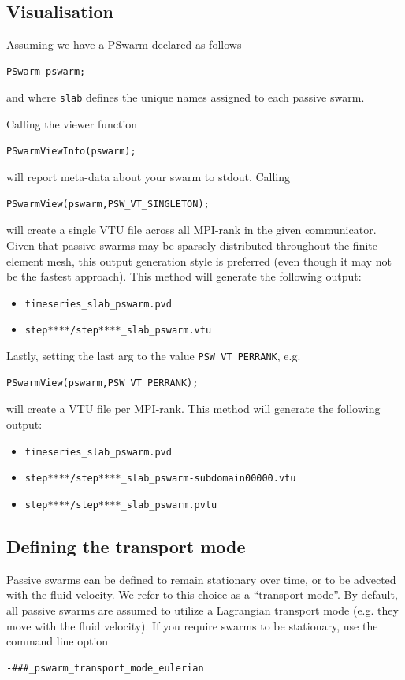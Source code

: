 \documentclass[paper=a4, fontsize=10pt,twoside]{scrartcl}
\begin{document}
{{\subsection{Visualisation}

Assuming we have a PSwarm declared as follows
\begin{lstlisting}
PSwarm pswarm;
\end{lstlisting}
and where \texttt{slab} defines the unique names assigned to each passive swarm.

Calling the viewer function
\begin{lstlisting}
PSwarmViewInfo(pswarm);
\end{lstlisting}
will report meta-data about your swarm to stdout.
Calling
\begin{lstlisting}
PSwarmView(pswarm,PSW_VT_SINGLETON);
\end{lstlisting}
will create a single VTU file across all MPI-rank in the given communicator.
Given that passive swarms may be sparsely distributed throughout the finite element mesh,
this output generation style is preferred (even though it may not be the fastest approach).
This method will generate the following output:
\begin{itemize}
\item \texttt{timeseries\_slab\_pswarm.pvd}
\item \texttt{step****/step****\_slab\_pswarm.vtu}
\end{itemize}
Lastly, setting the last arg to the value \texttt{PSW\_VT\_PERRANK}, e.g.
\begin{lstlisting}
PSwarmView(pswarm,PSW_VT_PERRANK);
\end{lstlisting}
will create a VTU file per MPI-rank.
This method will generate the following output:
\begin{itemize}
\item \texttt{timeseries\_slab\_pswarm.pvd}
\item \texttt{step****/step****\_slab\_pswarm-subdomain00000.vtu}
\item \texttt{step****/step****\_slab\_pswarm.pvtu}
\end{itemize}




\subsection{Defining the transport mode}

Passive swarms can be defined to remain stationary over time, or to be advected with the fluid velocity.
We refer to this choice as a ``transport mode''. By default, all passive swarms are assumed to utilize a
Lagrangian transport mode (e.g. they move with the fluid velocity). If you require swarms to be stationary,
use the command line option
\begin{lstlisting}
-###_pswarm_transport_mode_eulerian
\end{lstlisting}

}}
\end{document}
